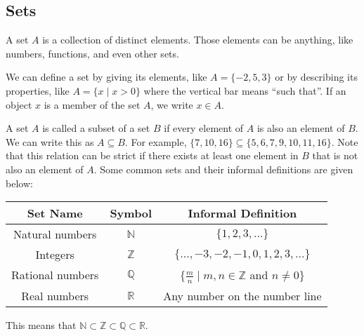 \subsection{Sets}
\begin{definition}
	A set $A$ is a collection of distinct elements. Those elements can be anything, like numbers, functions, and even other sets.
\end{definition}
We can define a set by giving its elements, like $A = \{-2, 5, 3\}$ or by describing its properties, like $A = \{x \mid x > 0\}$ where the vertical bar means ``such that''.
If an object $x$ is a member of the set $A$, we write $x\in A$.\bigskip


\noindent
A set $A$ is called a subset of a set $B$ if every element of $A$ is also an element of $B$. 
We can write this as $A \subseteq B$. 
For example, $\{7, 10, 16\} \subseteq \{5, 6, 7, 9, 10, 11, 16\}$. 
Note that this relation can be strict if there exists at least one element in $B$ that is not also an element of $A$. 
Some common sets and their informal definitions are given below:

\begin{table}[H]
	\centering
	\begin{tabular}{c|c|c}
		Set Name & Symbol & Informal Definition                                                                                                                         \\ \hline
		Natural numbers & $\mathbb{N}$ & $\{1, 2, 3, \dots\}$           						                                                                        \\
		Integers & $\mathbb{Z}$ & $\{\dots, -3, -2, -1, 0, 1, 2, 3, \dots\}$                                                                                            \\
		Rational numbers & $\mathbb{Q}$ & $\{\frac{m}{n} \mid m,n \in\mathbb{Z}$ and $n \neq 0\}$                                                                       \\
		Real numbers & $\mathbb{R}$ & Any number on the number line
	\end{tabular}
\end{table}

This means that $\mathbb{N} \subset \mathbb{Z} \subset \mathbb{Q} \subset \mathbb{R}$.\bigskip


